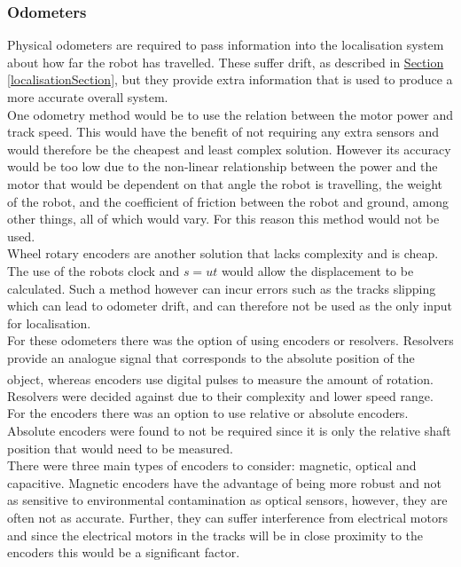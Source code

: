 \documentclass[11pt]{article}		%
\newcommand{\supercite}[1]{\textsuperscript{\cite{#1}}}		%
\newcommand{\sectref}[1]{\hyperref[#1]{Section \ref*{#1}}}     %
\begin{document}
        \subsubsection{Odometers}
        
	        Physical odometers are required to pass information into the localisation system about how far the robot has travelled.
	        These suffer drift, as described in \sectref{localisationSection}, but they provide extra information that is used to produce a more accurate overall system.
	        \\
	        One odometry method would be to use the relation between the motor power and track speed.
	        This would have the benefit of not requiring any extra sensors and would therefore be the cheapest and least complex solution.
	        However its accuracy would be too low due to the non-linear relationship between the power and the motor that would be dependent on that angle the robot is travelling, the weight of the robot, and the coefficient of friction between the robot and ground, among other things, all of which would vary.
	        For this reason this method would not be used.
	        \\
	        Wheel rotary encoders are another solution that lacks complexity and is cheap.
	        The use of the robots clock and $s=ut$ would allow the displacement to be calculated. 
	        Such a method however can incur errors such as the tracks slipping which can lead to odometer drift, and can therefore not be used as the only input for localisation.
	        \\
	        For these odometers there was the option of using encoders or resolvers. Resolvers provide an analogue signal that corresponds to the absolute position of the object, whereas encoders use digital pulses to measure the amount of rotation.\supercite{Encoder_resolver}
	        Resolvers were decided against due to their complexity and lower speed range.
	        For the encoders there was an option to use relative or absolute encoders. 
	        Absolute encoders were found to not be required since it is only the relative shaft position that would need to be measured.
	        \\
	        There were three main types of encoders to consider: magnetic, optical and capacitive.
	        Magnetic encoders have the advantage of being more robust and not as sensitive to environmental contamination as optical sensors, however, they are often not as accurate. 
	        Further, they can suffer interference from electrical motors and since the electrical motors in the tracks will be in close proximity to the encoders this would be a significant factor. 
\end{document}
